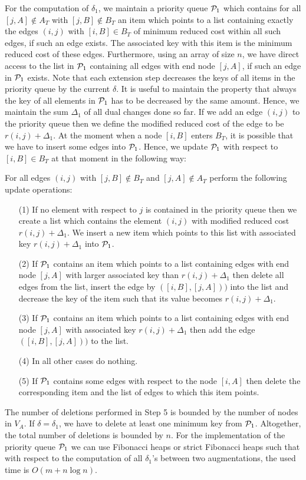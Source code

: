 \documentclass[12pt,twoside,a4paper]{article}
\begin{document}
For the computation of $\delta_1$, we maintain a priority queue ${\cal P}_1$
which contains for all $[j,A] \not\in A_T$ with $[j,B] \not\in B_T$ an item
which points to a list containing exactly the edges $(i,j)$ with $[i,B] \in B_T$
of minimum reduced cost within all such edges, if such an edge exists. The 
associated key with this item is the minimum reduced cost of these edges.
Furthermore, using an array of size $n$, we have direct access to the list in ${\cal P}_1$ 
containing all edges with end node $[j,A]$, if such an edge in ${\cal P}_1$ exists.
Note that each extension step decreases the keys of all items in the
priority queue by the current $\delta$. It is useful to maintain the property
that always the key of all elements in ${\cal P}_1$ has to be decreased by the same
amount. Hence, we maintain the sum $\Delta_1$ of all dual changes
done so far. If we add an edge $(i,j)$ to the priority queue then we define
the modified reduced cost of the edge to be $r(i,j) + \Delta_1$.
At the moment when a node $[i,B]$ enters $B_T$, it is possible that we have to insert some
edges into ${\cal P}_1$. Hence, we update ${\cal P}_1$ with respect to $[i,B] \in B_T$ 
at that moment in the following way:

\medskip
For all edges $(i,j)$ with $[j,B] \not\in B_T$ and $[j,A] \not\in A_T$ perform 
the following update operations: 
\begin{itemize}
\item[(1)]
If no element with respect to $j$ is contained in the priority queue then
we create a list which contains the element $(i,j)$ with modified reduced cost 
$r(i,j) + \Delta_1$. We insert a new item which points to this list with associated
key $r(i,j) + \Delta_1$ into ${\cal P}_1$.
\item[(2)]
If ${\cal P}_1$ contains an item which points to a list containing edges with end node
$[j,A]$ with larger associated key than $r(i,j) + \Delta_1$ 
then delete all edges from the list, insert the edge by $([i,B],[j,A]))$ into the list and 
decrease the key of the item such that its value becomes $r(i,j) + \Delta_1$.
\item[(3)]
If ${\cal P}_1$ contains an item which points to a list containing edges with end node
$[j,A]$ with associated key $r(i,j) + \Delta_1$ then add the edge $([i,B],[j,A]))$ to the 
list.
\item[(4)]
In all other cases do nothing.
\item[(5)]
If ${\cal P}_1$ contains some edges with respect to the node $[i,A]$ then 
delete the corresponding item and the list of edges to which this item points.
\end{itemize}
The number of deletions performed in Step 5 is bounded by the number of nodes
in $V_A$. If $\delta = \delta_1$, we have to delete at least one minimum
key from ${\cal P}_1$. Altogether, the total number of deletions is bounded by $n$.
For the implementation of the priority queue ${\cal P}_1$ we can use
Fibonacci heaps \cite{FrTa} or strict Fibonacci heaps \cite{BrLaTa} such that
with respect to the computation of all $\delta_1$'s between two
augmentations, the used time is $O(m + n \log n)$.
\end{document}

